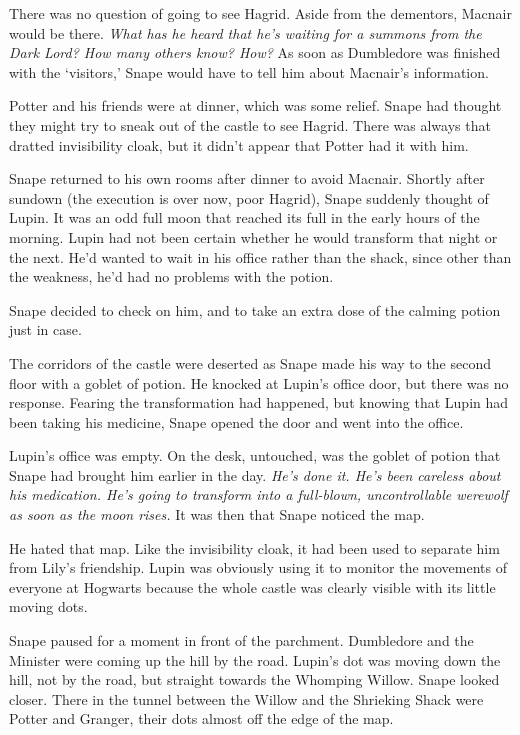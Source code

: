 There was no question of going to see Hagrid. Aside from the dementors, Macnair would be there. \emph{What has he heard that he's waiting for a summons from the Dark Lord? How many others know? How?} As soon as Dumbledore was finished with the `visitors,' Snape would have to tell him about Macnair's information.

Potter and his friends were at dinner, which was some relief. Snape had thought they might try to sneak out of the castle to see Hagrid. There was always that dratted invisibility cloak, but it didn't appear that Potter had it with him.

Snape returned to his own rooms after dinner to avoid Macnair. Shortly after sundown (the execution is over now, poor Hagrid), Snape suddenly thought of Lupin. It was an odd full moon that reached its full in the early hours of the morning. Lupin had not been certain whether he would transform that night or the next. He'd wanted to wait in his office rather than the shack, since other than the weakness, he'd had no problems with the potion.

Snape decided to check on him, and to take an extra dose of the calming potion just in case.

The corridors of the castle were deserted as Snape made his way to the second floor with a goblet of potion. He knocked at Lupin's office door, but there was no response. Fearing the transformation had happened, but knowing that Lupin had been taking his medicine, Snape opened the door and went into the office.

Lupin's office was empty. On the desk, untouched, was the goblet of potion that Snape had brought him earlier in the day. \emph{He's done it. He's been careless about his medication. He's going to transform into a full-blown, uncontrollable werewolf as soon as the moon rises.} It was then that Snape noticed the map.

He hated that map. Like the invisibility cloak, it had been used to separate him from Lily's friendship. Lupin was obviously using it to monitor the movements of everyone at Hogwarts because the whole castle was clearly visible with its little moving dots.

Snape paused for a moment in front of the parchment. Dumbledore and the Minister were coming up the hill by the road. Lupin's dot was moving down the hill, not by the road, but straight towards the Whomping Willow. Snape looked closer. There in the tunnel between the Willow and the Shrieking Shack were Potter and Granger, their dots almost off the edge of the map.

